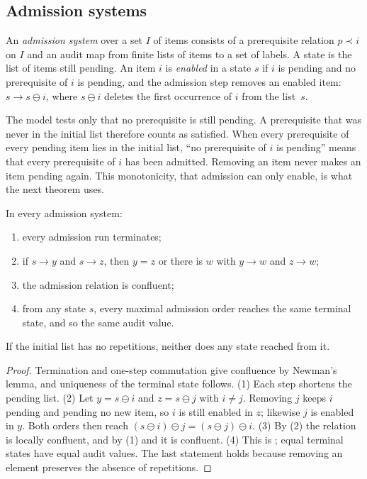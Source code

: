\subsection{Admission systems}

\begin{definition}
\label{def:admission-system}
An \emph{admission system} over a set $I$ of items consists of a prerequisite relation
$p\prec i$ on $I$ and an audit map from finite lists of items to a set of labels. A state
is the list of items still pending. An item $i$ is \emph{enabled} in a state $s$ if $i$ is
pending and no prerequisite of $i$ is pending, and the admission step removes an enabled
item: $s\to s\ominus i$, where $s\ominus i$ deletes the first occurrence of $i$ from the
list~$s$.
\end{definition}

The model tests only that no prerequisite is still pending. A prerequisite that was never
in the initial list therefore counts as satisfied. When every prerequisite of every
pending item lies in the initial list, ``no prerequisite of $i$ is pending'' means that
every prerequisite of $i$ has been admitted. Removing an item never makes an item pending
again. This monotonicity, that admission can only
enable, is what the next theorem uses.

\begin{theorem}
\label{thm:admission}
In every admission system:
\begin{enumerate}[nosep]
  \item every admission run terminates;
  \item if $s\to y$ and $s\to z$, then $y=z$ or there is $w$ with $y\to w$ and $z\to w$;
  \item the admission relation is confluent;
  \item from any state $s$, every maximal admission order reaches the same terminal state,
        and so the same audit value.
\end{enumerate}
If the initial list has no repetitions, neither does any state reached from it.
\end{theorem}

\begin{proof}
Termination and one-step commutation give confluence by Newman's lemma, and uniqueness of the terminal state
follows.
(1) Each step shortens the pending list. (2) Let $y=s\ominus i$ and
$z=s\ominus j$ with $i\neq j$. Removing $j$ keeps $i$ pending and pending no new
item, so $i$ is still enabled in $z$; likewise $j$ is enabled in $y$. Both orders then
reach $(s\ominus i)\ominus j=(s\ominus j)\ominus i$. (3) By (2) the relation is locally confluent, and by (1) and
 it is confluent. (4) This is ; equal terminal
states have equal audit values. The last statement holds because removing an element
preserves the absence of repetitions.
\end{proof}


